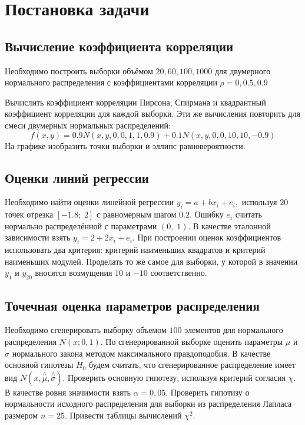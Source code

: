 \documentclass[a4]{article}
\renewcommand{\listoffigures}{\begingroup %
\tocsection
\tocfile{\listfigurename}{lof}
\endgroup}
\renewcommand{\listoftables}{\begingroup %
\tocsection
\tocfile{\listtablename}{lot}
\endgroup}
\begin{document}



\newpage
\tableofcontents{}
\newpage
\listoffigures{}
\listoftables{}
\newpage

\section{Постановка задачи}

\subsection{Вычисление коэффициента корреляции}

Необходимо построить выборки объёмом $20, 60, 100, 1000$ для двумерного нормального распределения с коэффициентами корреляции $\rho = 0, 0.5, 0.9$

Вычислить коэффициент корреляции Пирсона, Спирмана и квадрантный коэффициент корреляции для каждой выборки. Эти же вычисления повторить для смеси двумерных нормальных распределений: 
\begin{equation}
    f(x,y) = 0.9N(x,y,0,0,1,1,0.9)+0.1N(x,y,0,0,10,10,-0.9)
\end{equation}
На графике изобразить точки выборки и эллипс равновероятности.

\subsection{Оценки линий регрессии}
Необходимо найти оценки линейной регрессии $y_i=a+bx_i+e_i,$ используя $20$ точек отрезка $[-1.8;\;2]$ с равномерным шагом $0.2.$ Ошибку $e_i$ считать нормально распределённой с параметрами $(0,\;1).$ В качестве эталонной зависимости взять $y_i=2+2x_i+e_i.$ При построении оценок коэффициентов использовать два критерия: критерий наименьших квадратов и критерий наименьших модулей.
Проделать то же самое для выборки, у которой в значении $y_1$ и $y_{20}$ вносятся возмущения $10$ и $-10$ соответственно.

\subsection{Точечная оценка параметров распределения}

Необходимо сгенерировать выборку объемом $100$ элементов для нормального распределения $N(x;0,1).$ По сгенерированной выборке оценить параметры $\mu$ и $\sigma$ нормального закона методом максимального правдоподобия. В качестве основной гипотезы $H_0$ будем считать, что сгенерированное распределение имеет вид $N(x,\overset{\wedge}{\mu},\overset{\wedge}{\sigma} ).$ Проверить основную гипотезу, используя критерий согласия $\chi$. В качестве ровня значимости взять $\alpha=0,05.$ Проверить гипотизу о нормальности исходного распределения для выборки из распределения Лапласа размером $ n = 25 .$ Привести таблицы вычислений $\chi^2.$
\end{document}

